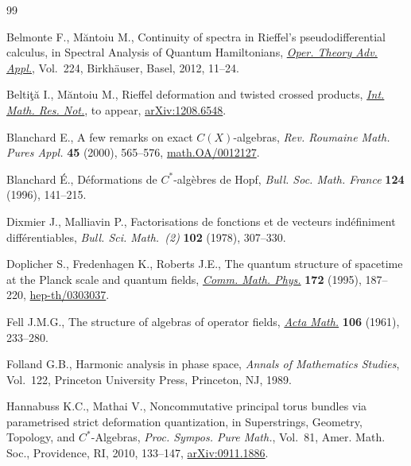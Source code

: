 \documentclass[pdftex]{sigma}
\begin{document}
\begin{thebibliography}{99}
\footnotesize\itemsep=0pt

Belmonte F., M{\u{a}}ntoiu M., Continuity of spectra in {R}ief\/fel's
  pseudodif\/ferential calculus, in Spectral Analy\-sis of Quantum {H}amiltonians,
  \href{http://dx.doi.org/10.1007/978-3-0348-0414-1_2}{\textit{Oper. Theory Adv. Appl.}}, Vol.~224, Birkh\"auser, Basel, 2012,
  11--24.

Belti\c{t}\u{a} I., M\u{a}ntoiu M.,
Rief\/fel deformation and twisted crossed products,
\href{http://dx.doi.org/10.1093/imrn/rns231}{\textit{Int. Math. Res. Not.}}, to appear, \href{http://arxiv.org/abs/1208.6548}{arXiv:1208.6548}.


Blanchard E., A few remarks on exact {$C(X)$}-algebras, \textit{Rev. Roumaine
  Math. Pures Appl.} \textbf{45} (2000), 565--576, \href{http://arxiv.org/abs/math.OA/0012127}{math.OA/0012127}.

Blanchard {\'E}., D\'eformations de {$C^*$}-alg\`ebres de {H}opf, \textit{Bull.
  Soc. Math. France} \textbf{124} (1996), 141--215.


Dixmier J., Malliavin P., Factorisations de fonctions et de vecteurs
  ind\'ef\/iniment dif\/f\'erentiables, \textit{Bull. Sci. Math.~(2)} \textbf{102}
  (1978), 307--330.

Doplicher S., Fredenhagen K., Roberts J.E., The quantum structure of spacetime
  at the {P}lanck scale and quantum f\/ields, \href{http://dx.doi.org/10.1007/BF02104515}{\textit{Comm. Math. Phys.}}
  \textbf{172} (1995), 187--220, \href{http://arxiv.org/abs/hep-th/0303037}{hep-th/0303037}.

Fell J.M.G., The structure of algebras of operator f\/ields, \href{http://dx.doi.org/10.1007/BF02545788}{\textit{Acta Math.}}
  \textbf{106} (1961), 233--280.

Folland G.B., Harmonic analysis in phase space, \textit{Annals of Mathematics
  Studies}, Vol.~122, Princeton University Press, Princeton, NJ, 1989.

Hannabuss K.C., Mathai V., Noncommutative principal torus bundles via
  parametrised strict deformation quantization, in Superstrings, Geometry,
  Topology, and {$C^*$}-Algebras, \textit{Proc. Sympos. Pure Math.}, Vol.~81,
  Amer. Math. Soc., Providence, RI, 2010, 133--147, \href{http://arxiv.org/abs/0911.1886}{arXiv:0911.1886}.


\end{thebibliography}
\end{document}
